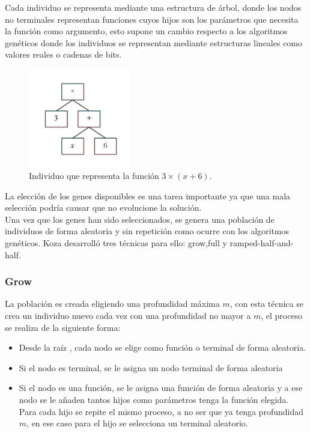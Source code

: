 \documentclass[12pt]{article} \usepackage[utf8x]{inputenc}
\begin{document}
Cada individuo se representa mediante una estructura de árbol, donde 
los nodos no terminales representan funciones cuyos hijos son los 
parámetros que necesita la función como argumento, esto supone un
cambio respecto a los algoritmos genéticos donde los individuos se
representan mediante estructuras lineales como valores reales o
cadenas de bits.

\begin{figure}[H]
  \centering
  \includegraphics[width=0.4\textwidth]{individuo.PNG}
  \caption{Individuo que representa la función \(3\times(x+6)\).}
  \label{fig:dfd:1}
\end{figure}


La elección de los genes disponibles es una tarea importante 
ya que una mala selección podría causar que no evolucione 
la solución.\\

Una vez que los genes han sido seleccionados, se genera una 
población de individuos de forma aleatoria y sin repetición 
como ocurre con los algoritmos genéticos. Koza desarrolló 
tres técnicas para ello: grow,full y ramped-half-and-half.


\subsubsection{Grow}

La población es creada eligiendo una profundidad máxima \(m\),
con esta técnica se crea un individuo nuevo cada vez con una
profundidad no mayor a \(m\),
el proceso se realiza de la siguiente forma:
\begin{itemize}
\item Desde la raíz , cada nodo se elige como función o terminal de
  forma aleatoria.
\item Si el nodo es terminal, se le asigna un nodo terminal de forma
  aleatoria
\item Si el nodo es una función, se le asigna una función de forma
  aleatoria y a ese nodo se le añaden tantos hijos como parámetros
  tenga la función elegida. Para cada hijo se repite el mismo proceso,
  a no ser que ya tenga profundidad \(m\),
  en ese caso para el hijo se selecciona un terminal aleatorio.
\end{itemize}
\end{document}

